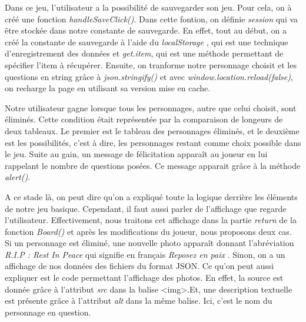 \documentclass[a4paper, 12pt]{article}
\begin{document}
Dans ce jeu, l'utilisateur a la possibilité de sauvegarder son jeu. Pour cela, on à créé une fonction \textit{handleSaveClick()}. Dans cette fontion, on définie \textit{session} qui va être stockée dans notre constante de sauvegarde.\newline
En effet, tout au début, on a créé la constante de sauvegarde à l'aide du \textit{localStorage} , qui est une technique d'enregistrement des données et \textit{get.item}, qui est une méthode permettant de spécifier l'item à récupérer.\newline
 Ensuite, on tranforme notre personnage choisit et les questions en string grâce à \textit{json.stringify()}  et avec \textit{window.location.reload(false)}, on recharge la page en utilisant sa version mise en cache.\newline

Notre utilisateur gagne lorsque tous les personnages, autre que celui choisit, sont éliminés. Cette condition était représentée par la comparaison de longeurs de deux tableaux. Le premier est le tableau des personnages éliminés, et le deuxième est les possibilités, c'est à dire, les personnages restant comme choix possible dans le jeu.\newline
Suite au gain, un message de félicitation apparaît au joueur en lui rappelant le nombre de questions posées. Ce message apparait grâce à la méthode \textit{alert()}. \newline

A ce stade là, on peut dire qu'on a expliqué toute la logique derrière les éléments de  notre jeu basique. Cependant, il faut aussi parler de l'affichage que regarde l'utilisateur. \newline
Effectivement, nous traitons cet affichage dans la partie \textit{return} de la fonction  \textit{Board()} et après les modifications du joueur, nous proposons deux cas. Si un personnage est éliminé, une nouvelle photo apparaît donnant l'abréviation \textit{R.I.P : Rest In Peace} qui signifie en français \textit{Reposez en paix} . Sinon, on a un affichage de nos données des fichiers du format JSON.\newline 
Ce qu'on peut aussi expliquer est le code permettant l'affichage des photos. En effet, la source est donnée grâce à l'attribut  \textit{src} dans la balise <img>.Et, une description textuelle est présente grâce à l'attribut \textit{alt} dans la même balise. Ici, c'est le nom du personnage en question. 
\end{document}
